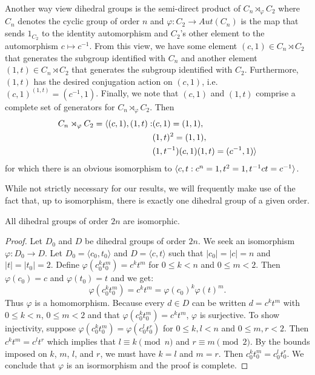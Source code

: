 \documentclass[main.tex]{subfiles}
\begin{document}
Another way view dihedral groups is the semi-direct product of $C_n \rtimes_\varphi C_2$ where $C_n$ denotes the cyclic group of order $n$ and $\varphi : C_2 \to Aut(C_n)$ is the map that sends $1_{C_2}$ to the identity automorphism and $C_2$'s other element to the automorphism $c \mapsto c^{-1}$. From this view, we have some element $(c, 1) \in C_n \rtimes C_2$ that generates the subgroup identified with $C_n$ and another element $(1, t) \in C_n \rtimes C_2$ that generates the subgroup identified with $C_2$. Furthermore, $(1, t)$ has the desired conjugation action on $(c, 1)$, i.e. $(c,1)^{(1,t)} = (c^{-1}, 1)$. Finally, we note that $(c, 1)$ and $(1, t)$ comprise a complete set of generators for $C_n \rtimes_\varphi C_2$. Then 
\begin{align*}
C_n \rtimes_\varphi C_2 = \langle (c, 1), (1, t) :  &(c, 1) = (1, 1), \\
&(1, t)^2 = (1, 1), \\
&(1, t^{-1})(c, 1)(1, t) = (c^{-1}, 1) \rangle
\end{align*}
for which there is an obvious isomorphism to $\langle c, t : c^n = 1, t^2 = 1, t^{-1} c t = c^{-1} \rangle$.

\hss

While not strictly necessary for our results, we will frequently make use of the fact that, up to isomorphism, there is exactly one dihedral group of a given order.

\begin{theorem}
All dihedral groups of order $2n$ are isomorphic.
\end{theorem}

\begin{proof}
Let $D_0$ and $D$ be dihedral groups of order $2n$. We seek an isomorphism $\varphi: D_0 \to D$. Let $D_0 = \langle c_0, t_0 \rangle$ and $D = \langle c, t \rangle$ such that $|c_0| = |c| = n$ and $|t| = |t_0| = 2$. Define $\varphi(c_0^k t_0^m) = c^k t^m$ for $0 \le k < n$ and $0 \le m < 2$. Then $\varphi(c_0) = c$ and $\varphi(t_0) = t$ and we get:
$$\varphi(c_0^k t_0^m) = c^k t^m = \varphi(c_0)^k \varphi(t)^m \text{.}$$
Thus $\varphi$ is a homomorphism. Because every $d \in D$ can be written $d = c^k t^m$ with $0 \le k < n$, $0 \le m < 2$ and that $\varphi(c_0^k t_0^m) = c^k t^m$,  $\varphi$ is surjective. To show injectivity, suppose $\varphi(c_0^k t_0^m) = \varphi(c_0^l t_0^r)$ for $0 \le k, l < n$ and $0 \le m, r < 2$. Then $c^k t^m = c^l t^r$ which implies that $l \equiv k \pmod n$ and $r \equiv m \pmod 2$. By the bounds imposed on $k$, $m$, $l$, and $r$, we must have $k = l$ and $m = r$.  Then $c_0^k t_0^m = c_0^l t_0^r$. We conclude that $\varphi$ is an isormorphism and the proof is complete.
\end{proof}
\end{document}
